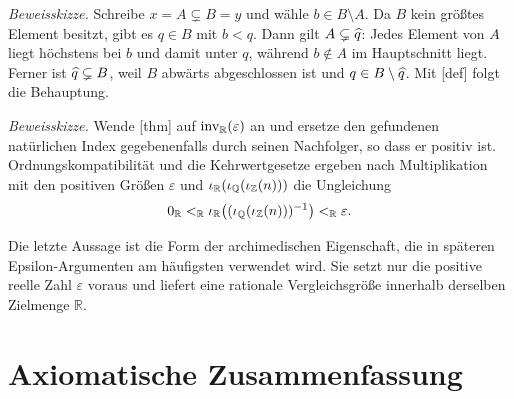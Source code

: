 \documentclass[main.tex]{subfiles}
\begin{document}

\emph{Beweisskizze.}
Schreibe \(x=A\subsetneq B=y\) und wähle \(b\in B\setminus A\). Da \(B\)
kein größtes Element besitzt, gibt es \(q\in B\) mit \(b<q\). Dann gilt
\(A\subsetneq\widehat{q}\): Jedes Element von \(A\) liegt höchstens bei \(b\)
und damit unter \(q\), während \(b\notin A\) im Hauptschnitt liegt. Ferner
ist \(\widehat{q}\subsetneq B\), weil \(B\) abwärts abgeschlossen ist und
\(q\in B\setminus\widehat{q}\). Mit
[def] folgt die Behauptung.


\emph{Beweisskizze.}
Wende [thm] auf
\(\operatorname{inv}_{\mathbb R}\!\left(\varepsilon\right)\) an und ersetze den gefundenen natürlichen Index
gegebenenfalls durch seinen Nachfolger, so dass er positiv ist.
Ordnungskompatibilität und
die Kehrwertgesetze ergeben nach Multiplikation mit den positiven Größen
\(\varepsilon\) und
\(\iota_{\mathbb R}(\iota_{\mathbb Q}(\iota_{\mathbb{Z}}(n)))\) die Ungleichung
\[
  0_{\mathbb R}\mathrel{<_{\mathbb R}}
  \iota_{\mathbb R}\bigl((\iota_{\mathbb Q}(\iota_{\mathbb{Z}}(n)))^{-1}\bigr)
  \mathrel{<_{\mathbb R}}\varepsilon .
\]

Die letzte Aussage ist die Form der archimedischen Eigenschaft, die in
späteren Epsilon-Argumenten am häufigsten verwendet wird. Sie setzt nur die
positive reelle Zahl \(\varepsilon\) voraus und liefert eine rationale
Vergleichsgröße innerhalb derselben Zielmenge \(\mathbb R\).

\chapter{Axiomatische Zusammenfassung}
\end{document}
